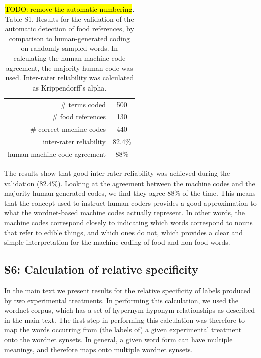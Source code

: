 \documentclass[12pt]{article}
\newcommand{\td}[1]{{\color{blu}\hl{TODO: #1}}}
\begin{document}
\begin{table}
\centering
\setlength{\tabcolsep}{12pt}
\begin{tabular}{ r | c }
\toprule    
\# terms coded & 500 \\
\# food references & 130 \\
\# correct machine codes & 440 \\
inter-rater reliability & 82.4\% \\
human-machine code agreement & 88\% \\
\bottomrule
\end{tabular}
\caption{\footnotesize{
	\td{remove the automatic numbering}. Table S1. Results for the validation 
	of the automatic detection of food references, by comparison to
	human-generated coding on randomly sampled words.  In calculating the 
	human-machine code agreement, the majority human code was used.
	Inter-rater reliability was calculated as Krippendorff's alpha.
}}
\end{table}

The results show that good inter-rater reliability was achieved during the
validation (82.4\%).  Looking at the agreement between the 
machine codes and the majority human-generated codes, we find they agree
88\% of the time.  This means that the concept used to instruct human coders
provides a good approximation to what the wordnet-based machine codes actually
represent. In other words, the machine codes correspond closely to indicating
which words correspond to nouns that refer to edible things, and which ones
do not, which provides a clear and simple interpretation for the machine
coding of food and non-food words.

\subsection*{S6: Calculation of relative specificity}
In the main text we present results for the relative specificity of labels
produced by two experimental treatments.  In performing this calculation,
we used the wordnet corpus, which has a set of hypernym-hyponym relationships
as described in the main text.  The first step in performing this calculation
was therefore to map the words occurring from (the labels of) a given 
experimental treatment onto the wordnet synsets.  In general, a given word
form can have multiple meanings, and therefore maps onto multiple wordnet 
synsets.
\end{document}
